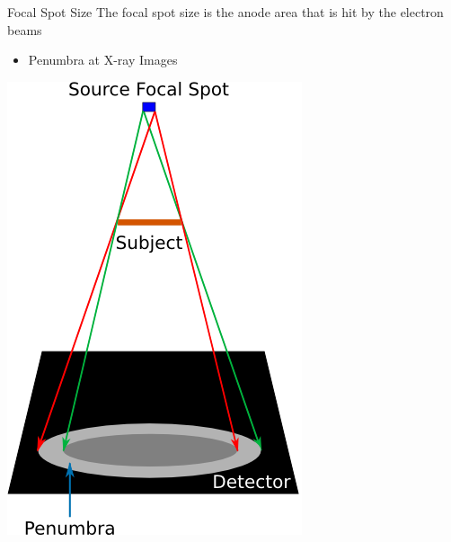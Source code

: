 \begin{frame}{Focal Spot Size}
    The focal spot size is the anode area that is hit by the electron beams

    \begin{itemize}
        \item Penumbra at X-ray Images
    \end{itemize}

    \begin{center}\includegraphics[height=0.7\textheight ]{images/penumbra}\end{center}
    \begin{flushright}
    \end{flushright}
\end{frame}

